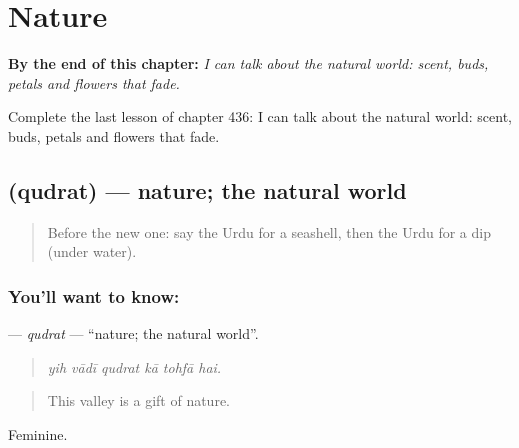 
\chapter{Nature}
\label{ch:ur-nature}

\begin{chapteropening}
\textbf{By the end of this chapter:} \emph{I can talk about the natural world: scent, buds, petals and flowers that fade.}

Complete the last lesson of chapter 436: I can talk about the natural world: scent, buds, petals and flowers that fade.
\end{chapteropening}

\section[\texorpdfstring{\ur{قدرت} (qudrat)}{قدرت (qudrat)}]{ (qudrat) — nature; the natural world}

\label{lesson:UR-C436-qudrat}



\begin{quote}
Before the new one: say the Urdu for a seashell, then the Urdu for a dip (under water).
\end{quote}

\subsection*{You'll want to know: }
\textbf{} — \emph{qudrat} — \textquotedblleft{}nature; the natural world\textquotedblright{}.

\begin{quote}
     
\end{quote}

\begin{quote}
\emph{yih vādī qudrat kā tohfā hai.}
\end{quote}

\begin{quote}
This valley is a gift of nature.
\end{quote}

Feminine.

